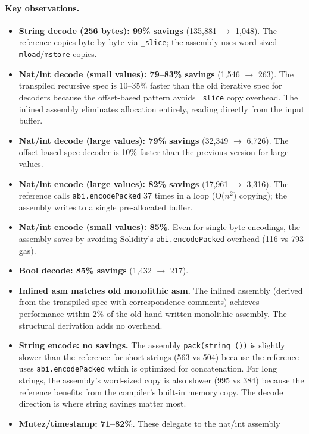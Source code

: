 \documentclass[11pt,a4paper]{article}
\begin{document}
\paragraph{Key observations.}
\begin{itemize}
  \item \textbf{String decode (256 bytes): 99\% savings} (135{,}881 $\to$ 1{,}048).
    The reference copies byte-by-byte via \texttt{\_slice}; the assembly uses
    word-sized \texttt{mload}/\texttt{mstore} copies.
  \item \textbf{Nat/int decode (small values): 79--83\% savings} (1{,}546 $\to$ 263).
    The transpiled recursive spec is 10--35\% faster than the old iterative spec
    for decoders because the offset-based pattern avoids \texttt{\_slice} copy
    overhead.  The inlined assembly eliminates allocation entirely, reading
    directly from the input buffer.
  \item \textbf{Nat/int decode (large values): 79\% savings} (32{,}349 $\to$ 6{,}726).
    The offset-based spec decoder is 10\% faster than the previous version for
    large values.
  \item \textbf{Nat/int encode (large values): 82\% savings} (17{,}961 $\to$ 3{,}316).
    The reference calls \texttt{abi.encodePacked} 37 times in a loop (O($n^2$)
    copying); the assembly writes to a single pre-allocated buffer.
  \item \textbf{Nat/int encode (small values): 85\%}. Even for single-byte
    encodings, the assembly saves by avoiding Solidity's \texttt{abi.encodePacked}
    overhead (116 vs 793 gas).
  \item \textbf{Bool decode: 85\% savings} (1{,}432 $\to$ 217).
  \item \textbf{Inlined asm matches old monolithic asm.} The inlined assembly
    (derived from the transpiled spec with correspondence comments) achieves
    performance within 2\% of the old hand-written monolithic assembly. The
    structural derivation adds no overhead.
  \item \textbf{String encode: no savings.} The assembly \texttt{pack(string\_())} is
    slightly slower than the reference for short strings (563 vs 504) because the
    reference uses \texttt{abi.encodePacked} which is optimized for concatenation.
    For long strings, the assembly's word-sized copy is also slower (995 vs 384)
    because the reference benefits from the compiler's built-in memory copy.
    The decode direction is where string savings matter most.
  \item \textbf{Mutez/timestamp: 71--82\%}. These delegate to the nat/int assembly

\end{itemize}
\end{document}
